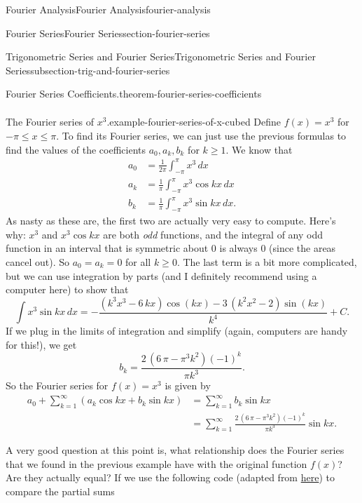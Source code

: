 \documentclass[oneside,10pt,]{book}
\numberwithin{equation}{section}
\newcommand{\amp}{&}
\begin{document}
\begin{chapterptx}{Fourier Analysis}{}{Fourier Analysis}{}{}{fourier-analysis}
\begin{sectionptx}{Fourier Series}{}{Fourier Series}{}{}{section-fourier-series}
\begin{subsectionptx}{Trigonometric Series and Fourier Series}{}{Trigonometric Series and Fourier Series}{}{}{subsection-trig-and-fourier-series}
\begin{theorem}{Fourier Series Coefficients.}{}{theorem-fourier-series-coefficients}
\begin{align*}
\end{align*}
%
\end{theorem}
\begin{example}{The Fourier series of \(x^{3}\).}{example-fourier-series-of-x-cubed}%
\hypertarget{p-583}{}%
Define \(f(x) = x^{3}\) for \(-\pi\leq x\leq \pi\). To find its Fourier series, we can just use the previous formulas to find the values of the coefficients \(a_{0},a_{k},b_{k}\) for \(k\geq1\). We know that%
\begin{align*}
a_{0} \amp = \frac{1}{2\pi}\int_{-\pi}^{\pi}x^{3}\,dx\\
a_{k} \amp = \frac{1}{\pi}\int_{-\pi}^{\pi}x^{3}\cos kx\,dx \\
b_{k} \amp = \frac{1}{\pi}\int_{-\pi}^{\pi}x^{3}\sin kx\,dx.
\end{align*}
As nasty as these are, the first two are actually very easy to compute. Here's why: \(x^{3}\) and \(x^{3}\cos kx\) are both \emph{odd} functions, and the integral of any odd function in an interval that is symmetric about \(0\) is always \(0\) (since the areas cancel out). So \(a_{0} = a_{k} = 0\) for all \(k\geq0\). The last term is a bit more complicated, but we can use integration by parts (and I definitely recommend using a computer here) to show that%
\begin{equation*}
\int x^{3}\sin kx\,dx = -\frac{{\left(k^{3} x^{3} - 6 \, k x\right)} \cos\left(k x\right) - 3 \, {\left(k^{2} x^{2} - 2\right)} \sin\left(k x\right)}{k^{4}} + C.
\end{equation*}
If we plug in the limits of integration and simplify (again, computers are handy for this!), we get%
\begin{equation*}
b_{k} = \frac{2 \, {\left(6 \, \pi - \pi^{3} k^{2}\right)} \left(-1\right)^{k}}{\pi k^{3}}.
\end{equation*}
So the Fourier series for \(f(x) = x^{3}\) is given by%
\begin{align*}
a_{0} + \sum_{k=1}^{\infty}(a_{k}\cos kx+b_{k}\sin kx) \amp= \sum_{k=1}^{\infty}b_{k}\sin kx \\
\amp= \sum_{k=1}^{\infty}\frac{2 \, {\left(6 \, \pi - \pi^{3} k^{2}\right)} \left(-1\right)^{k}}{\pi k^{3}}\sin kx. 
\end{align*}
%
\end{example}
\hypertarget{p-584}{}%
A very good question at this point is, what relationship does the Fourier series that we found in the previous example have with the original function \(f(x)\)? Are they actually equal? If we use the following code (adapted from \href{https://doxdrum.wordpress.com/2011/01/31/sage-tip-fourier-series-approximation/}{here}) to compare the partial sums%

\end{subsectionptx}
\end{sectionptx}
\end{chapterptx}
\end{document}
